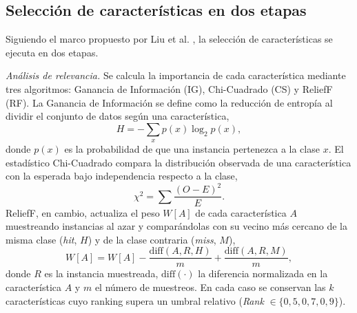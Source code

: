 \documentclass[conference,a4paper]{IEEEtran}
\begin{document}
\begin{table}[H]
\caption{Proporción de instancias con error (\textit{bug}) por nivel de granularidad, sobre los 15 proyectos individuales}
\label{tab:desbalance}
\centering
{}
\end{table}

\subsection{Selección de características en dos etapas}
\label{sec:seleccion}

Siguiendo el marco propuesto por Liu et al. \cite{liu2015}, la selección de características se ejecuta en dos etapas.

\textit{Análisis de relevancia.} Se calcula la importancia de cada característica mediante tres algoritmos: Ganancia de Información (IG), Chi-Cuadrado (CS) y ReliefF (RF). La Ganancia de Información se define como la reducción de entropía al dividir el conjunto de datos según una característica,
\begin{equation}
H = -\sum_{x} p(x)\log_{2}p(x),
\label{eq:entropia}
\end{equation}
donde $p(x)$ es la probabilidad de que una instancia pertenezca a la clase $x$. El estadístico Chi-Cuadrado compara la distribución observada de una característica con la esperada bajo independencia respecto a la clase,
\begin{equation}
\chi^{2} = \sum \frac{(O-E)^{2}}{E}.
\label{eq:chisqr}
\end{equation}
ReliefF, en cambio, actualiza el peso $W[A]$ de cada característica $A$ muestreando instancias al azar y comparándolas con su vecino más cercano de la misma clase (\textit{hit}, $H$) y de la clase contraria (\textit{miss}, $M$),
\begin{equation}
W[A] = W[A] - \frac{\mathrm{diff}(A,R,H)}{m} + \frac{\mathrm{diff}(A,R,M)}{m},
\label{eq:relief}
\end{equation}
donde $R$ es la instancia muestreada, $\mathrm{diff}(\cdot)$ la diferencia normalizada en la característica $A$ y $m$ el número de muestreos. En cada caso se conservan las $k$ características cuyo ranking supera un umbral relativo (\textit{Rank} $\in \{0{,}5, 0{,}7, 0{,}9\}$).
\end{document}

